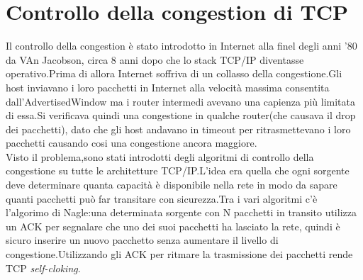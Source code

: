 \section{Controllo della congestion di TCP}
Il controllo della congestion è stato introdotto in Internet alla finel degli anni '80 da VAn Jacobson, circa 8 anni dopo che lo stack TCP/IP diventasse operativo.Prima di allora Internet soffriva di un collasso della congestione.Gli host inviavano i loro pacchetti in Internet alla velocità massima consentita dall'AdvertisedWindow ma i router intermedi avevano una capienza più limitata di essa.Si verificava quindi una congestione in qualche router(che causava il drop dei pacchetti), dato che gli host andavano in timeout per ritrasmettevano i loro pacchetti causando cosi una congestione ancora maggiore.\\
Visto il problema,sono stati introdotti degli algoritmi di controllo della congestione su tutte le architetture TCP/IP.L'idea era quella che ogni sorgente deve determinare quanta capacità è disponibile nella rete in modo da sapare quanti pacchetti può far transitare con sicurezza.Tra i vari algoritmi c'è l'algorimo di Nagle:una determinata sorgente con N pacchetti in transito utilizza un ACK per segnalare che uno dei suoi pacchetti ha lasciato la rete, quindi è sicuro inserire un nuovo pacchetto senza aumentare il livello di congestione.Utilizzando gli ACK per ritmare la trasmissione dei pacchetti rende TCP \textit{self-cloking}.\\

